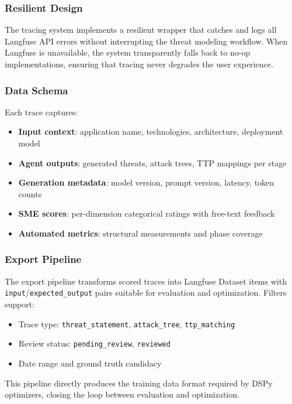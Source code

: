 \subsubsection{Resilient Design}

The tracing system implements a resilient wrapper that catches and logs all Langfuse API errors without interrupting the threat modeling workflow. When Langfuse is unavailable, the system transparently falls back to no-op implementations, ensuring that tracing never degrades the user experience.

\subsubsection{Data Schema}

Each trace captures:
\begin{itemize}
    \item \textbf{Input context}: application name, technologies, architecture, deployment model
    \item \textbf{Agent outputs}: generated threats, attack trees, TTP mappings per stage
    \item \textbf{Generation metadata}: model version, prompt version, latency, token counts
    \item \textbf{SME scores}: per-dimension categorical ratings with free-text feedback
    \item \textbf{Automated metrics}: structural measurements and phase coverage
\end{itemize}

\subsubsection{Export Pipeline}

The export pipeline transforms scored traces into Langfuse Dataset items with \texttt{input}/\texttt{expected\_output} pairs suitable for evaluation and optimization. Filters support:
\begin{itemize}
    \item Trace type: \texttt{threat\_statement}, \texttt{attack\_tree}, \texttt{ttp\_matching}
    \item Review status: \texttt{pending\_review}, \texttt{reviewed}
    \item Date range and ground truth candidacy
\end{itemize}

This pipeline directly produces the training data format required by DSPy optimizers, closing the loop between evaluation and optimization.
